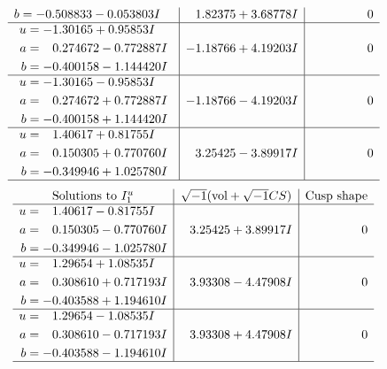 \documentclass[1p]{elsarticle_modified}
\theoremstyle{definition}
\newcommand{\I}{\sqrt{-1}}
\begin{document}
$$\begin{array}{c|c|c}
\begin{aligned}
b &= -0.508833 - 0.053803 I\end{aligned}
 & \phantom{-}1.82375 + 3.68778 I & \phantom{-0.000000 } 0 \\ \hline\begin{aligned}
u &= -1.30165 + 0.95853 I \\
a &= \phantom{-}0.274672 - 0.772887 I \\
b &= -0.400158 - 1.144420 I\end{aligned}
 & -1.18766 + 4.19203 I & \phantom{-0.000000 } 0 \\ \hline\begin{aligned}
u &= -1.30165 - 0.95853 I \\
a &= \phantom{-}0.274672 + 0.772887 I \\
b &= -0.400158 + 1.144420 I\end{aligned}
 & -1.18766 - 4.19203 I & \phantom{-0.000000 } 0 \\ \hline\begin{aligned}
u &= \phantom{-}1.40617 + 0.81755 I \\
a &= \phantom{-}0.150305 + 0.770760 I \\
b &= -0.349946 + 1.025780 I\end{aligned}
 & \phantom{-}3.25425 - 3.89917 I & \phantom{-0.000000 } 0\\
 \hline 
 \end{array}$$\newpage$$\begin{array}{c|c|c}  
\text{Solutions to }I^u_{1}& \I (\text{vol} + \sqrt{-1}CS) & \text{Cusp shape}\\
 \hline 
\begin{aligned}
u &= \phantom{-}1.40617 - 0.81755 I \\
a &= \phantom{-}0.150305 - 0.770760 I \\
b &= -0.349946 - 1.025780 I\end{aligned}
 & \phantom{-}3.25425 + 3.89917 I & \phantom{-0.000000 } 0 \\ \hline\begin{aligned}
u &= \phantom{-}1.29654 + 1.08535 I \\
a &= \phantom{-}0.308610 + 0.717193 I \\
b &= -0.403588 + 1.194610 I\end{aligned}
 & \phantom{-}3.93308 - 4.47908 I & \phantom{-0.000000 } 0 \\ \hline\begin{aligned}
u &= \phantom{-}1.29654 - 1.08535 I \\
a &= \phantom{-}0.308610 - 0.717193 I \\
b &= -0.403588 - 1.194610 I\end{aligned}
 & \phantom{-}3.93308 + 4.47908 I & \phantom{-0.000000 } 0\\
 \hline 
 \end{array}$$\newpage\newpage\renewcommand{\arraystretch}{1}
\end{document}
